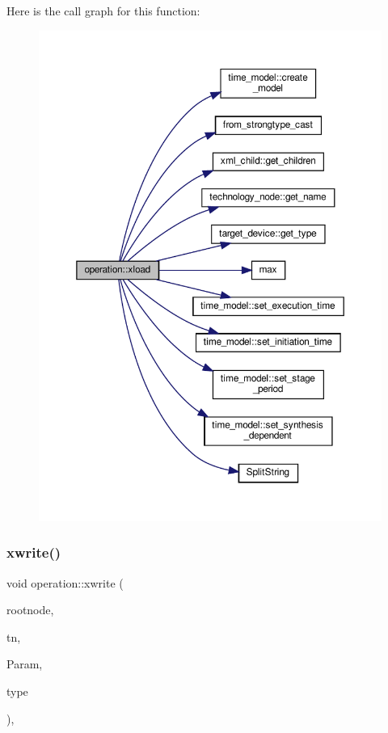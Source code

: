 Here is the call graph for this function\+:
\nopagebreak
\begin{figure}[H]
\begin{center}
\leavevmode
\includegraphics[width=350pt]{d9/dc0/structoperation_a7a8e56978864cac9d8f6c4f9391aa05a_cgraph}
\end{center}
\end{figure}
\mbox{\label{structoperation_a5edb965df8d7b05e912feabfbfe1306b}} 
\subsubsection{\texorpdfstring{xwrite()}{xwrite()}}
{\footnotesize\ttfamily void operation\+::xwrite (\begin{DoxyParamCaption}\item[{\hyperlink{classxml__element}{xml\+\_\+element} $\ast$}]{rootnode,  }\item[{const \hyperlink{technology__node_8hpp_a33dd193b7bd6b987bf0d8a770a819fa7}{technology\+\_\+node\+Ref}}]{tn,  }\item[{const \hyperlink{Parameter_8hpp_a37841774a6fcb479b597fdf8955eb4ea}{Parameter\+Const\+Ref}}]{Param,  }\item[{const \hyperlink{target__device_8hpp_a476becc690220f0805ce73006449c732}{Target\+Device\+\_\+\+Type}}]{type }\end{DoxyParamCaption})\hspace{0.3cm}{\ttfamily [override]}, {\ttfamily [virtual]}}




